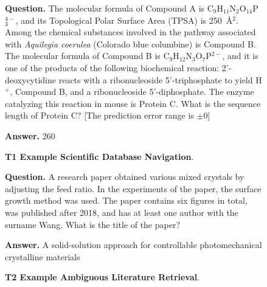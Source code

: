 \clearpage
\begin{figure}[t]
\centering
\begin{examplebox}
\textbf{Question.}  
The molecular formula of Compound A is C$_9$H$_{11}$N$_2$O$_{14}$P$_3^{4-}$, and its Topological Polar Surface Area (TPSA) is 250~\AA$^2$.  
Among the chemical substances involved in the pathway associated with \textit{Aquilegia coerulea} (Colorado blue columbine) is Compound B.  
The molecular formula of Compound B is C$_9$H$_{12}$N$_3$O$_7$P$^{2-}$, and it is one of the products of the following biochemical reaction:  
2'-deoxycytidine reacts with a ribonucleoside 5'-triphosphate to yield H$^+$, Compound B, and a ribonucleoside 5'-diphosphate.  
The enzyme catalyzing this reaction in mouse is Protein C.  
What is the sequence length of Protein C?  
[The prediction error range is $\pm 0$]

\vspace{0.5em}
\textbf{Answer.}  
260
\end{examplebox}
\caption{\textbf{T1 Example Scientific Database Navigation}.}
\label{fig:example-t1}
\end{figure}

\begin{figure}[t]
\centering
\begin{examplebox}
\textbf{Question.}  
A research paper obtained various mixed crystals by adjusting the feed ratio.  
In the experiments of the paper, the surface growth method was used.  
The paper contains six figures in total, was published after 2018, and has at least one author with the surname Wang.  
What is the title of the paper?

\vspace{0.5em}
\textbf{Answer.}  
A solid-solution approach for controllable photomechanical crystalline materials
\end{examplebox}
\caption{\textbf{T2 Example Ambiguous Literature Retrieval}.}
\label{fig:example-t2}
\end{figure}

